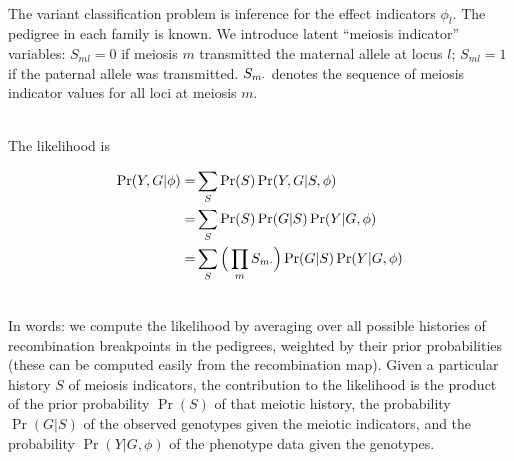 \documentclass[11pt]{article}
\newcommand{\p}{~\\}
\newcommand{\Sm}{S_{m\bold{\cdot}}}
\begin{document}
\p The variant classification problem is inference for the effect
indicators $\phi_l$. The pedigree in each family is known. We
introduce latent ``meiosis indicator'' variables: $S_{ml}=0$ if
meiosis $m$ transmitted the maternal allele at locus $l$; $S_{ml}=1$
if the paternal allele was transmitted. $\Sm$ denotes the sequence of
meiosis indicator values for all loci at meiosis $m$.

\p The likelihood is

\begin{align*}
\Pr(Y, G|\phi)
=& \sum_S \Pr(S) \Pr(Y,G|S,\phi)\\
=& \sum_S \Pr(S) \Pr(G|S) \Pr(Y|G,\phi)\\
=& \sum_S \Big(\prod_m\Sm \Big) \Pr(G|S) \Pr(Y|G,\phi)\\
\end{align*}

\p In words: we compute the likelihood by averaging over all possible
histories of recombination breakpoints in the pedigrees, weighted by
their prior probabilities (these can be computed easily from the
recombination map). Given a particular history $S$ of meiosis
indicators, the contribution to the likelihood is the product of the
prior probability $\Pr(S)$ of that meiotic history, the probability
$\Pr(G|S)$ of the observed genotypes given the meiotic indicators, and
the probability $\Pr(Y|G,\phi)$ of the phenotype data given the
genotypes.
\end{document}
